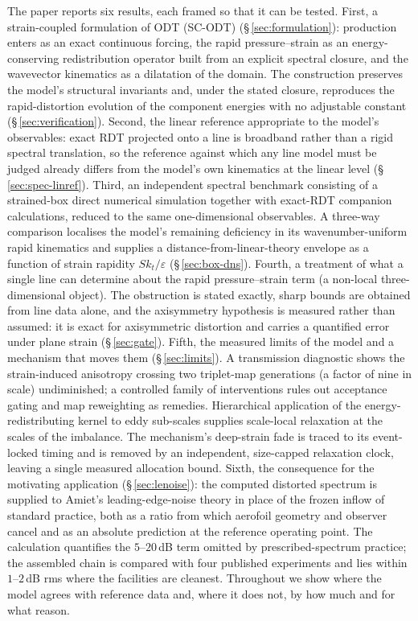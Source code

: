 \documentclass[11pt,a4paper]{article}
\begin{document}
The paper reports six results, each framed so that it can be tested.
First, a strain-coupled formulation of ODT (SC-ODT)
(\S\,\ref{sec:formulation}): production enters as an exact continuous
forcing, the rapid pressure--strain as an energy-conserving redistribution
operator built from an explicit spectral closure, and the wavevector
kinematics as a dilatation of the domain. The construction preserves the
model's structural invariants and, under the stated closure, reproduces
the rapid-distortion evolution of the component energies with no adjustable
constant (\S\,\ref{sec:verification}). Second, the linear reference
appropriate to the model's observables: exact RDT projected onto a line is
broadband rather than a rigid spectral translation, so the reference against
which any line model must be judged already differs from the model's own
kinematics at the linear level (\S\,\ref{sec:spec-linref}). Third, an
independent spectral benchmark consisting of a strained-box direct numerical
simulation together with exact-RDT companion calculations, reduced to the
same one-dimensional observables. A three-way comparison localises the
model's remaining deficiency in its wavenumber-uniform rapid kinematics and
supplies a distance-from-linear-theory envelope as a function of strain
rapidity $Sk_t/\varepsilon$ (\S\,\ref{sec:box-dns}). Fourth, a treatment of
what a single line can determine about the rapid pressure--strain term (a
non-local three-dimensional object). The obstruction is stated exactly,
sharp bounds are obtained from line data alone, and the axisymmetry
hypothesis is measured rather than assumed: it is exact for axisymmetric
distortion and carries a quantified error under plane strain
(\S\,\ref{sec:gate}). Fifth, the measured limits of the model and a
mechanism that moves them (\S\,\ref{sec:limits}). A transmission diagnostic
shows the strain-induced anisotropy crossing two triplet-map generations
(a factor of nine in scale) undiminished; a controlled family of
interventions rules out acceptance gating and map reweighting as remedies.
Hierarchical application of the energy-redistributing kernel to eddy
sub-scales supplies scale-local relaxation at the scales of the imbalance.
The mechanism's deep-strain fade is traced to its event-locked timing and
is removed by an independent, size-capped relaxation clock, leaving a
single measured allocation bound. Sixth, the consequence for the
motivating application (\S\,\ref{sec:lenoise}): the computed distorted
spectrum is supplied to Amiet's leading-edge-noise theory in place of the
frozen inflow of standard practice, both as a ratio from which aerofoil
geometry and observer cancel and as an absolute prediction at the reference
operating point. The calculation quantifies the $5$--$20$\,dB term omitted
by prescribed-spectrum practice; the assembled chain is compared with four
published experiments and lies within $1$--$2$\,dB rms where the facilities
are cleanest. Throughout we show where the model agrees with reference data
and, where it does not, by how much and for what reason.
\end{document}
